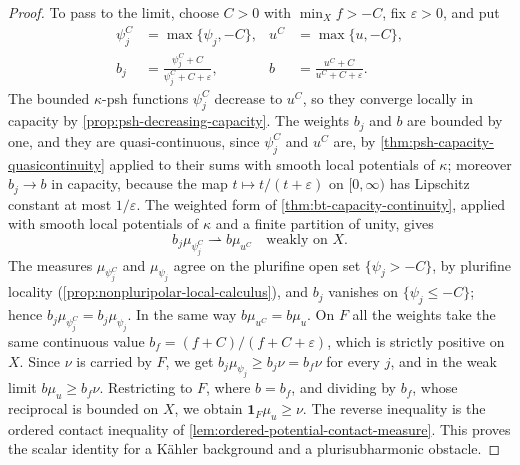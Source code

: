 \begin{proof}
To pass to the limit, choose $C>0$ with $\min_Xf>-C$, fix $\varepsilon>0$, and put
\[
 \begin{aligned}
 \psi_j^C&=\max\{\psi_j,-C\},&
 u^C&=\max\{u,-C\},\\
 b_j&=\frac{\psi_j^C+C}{\psi_j^C+C+\varepsilon},&
 b&=\frac{u^C+C}{u^C+C+\varepsilon}.
 \end{aligned}
\]
The bounded $\kappa$-psh functions $\psi_j^C$ decrease to $u^C$, so they converge locally in capacity by \cref{prop:psh-decreasing-capacity}. The weights $b_j$ and $b$ are bounded by one, and they are quasi-continuous, since $\psi_j^C$ and $u^C$ are, by \cref{thm:psh-capacity-quasicontinuity} applied to their sums with smooth local potentials of $\kappa$; moreover $b_j\to b$ in capacity, because the map $t\mapsto t/(t+\varepsilon)$ on $[0,\infty)$ has Lipschitz constant at most $1/\varepsilon$. The weighted form of \cref{thm:bt-capacity-continuity}, applied with smooth local potentials of $\kappa$ and a finite partition of unity, gives
\[
 b_j\mu_{\psi_j^C}\rightharpoonup b\mu_{u^C}
 \quad\text{weakly on }X.
\]
The measures $\mu_{\psi_j^C}$ and $\mu_{\psi_j}$ agree on the plurifine open set $\{\psi_j>-C\}$, by plurifine locality (\cref{prop:nonpluripolar-local-calculus}), and $b_j$ vanishes on $\{\psi_j\leq-C\}$; hence $b_j\mu_{\psi_j^C}=b_j\mu_{\psi_j}$. In the same way $b\mu_{u^C}=b\mu_u$. On $F$ all the weights take the same continuous value $b_f=(f+C)/(f+C+\varepsilon)$, which is strictly positive on $X$. Since $\nu$ is carried by $F$, we get $b_j\mu_{\psi_j}\geq b_j\nu=b_f\nu$ for every $j$, and in the weak limit $b\mu_u\geq b_f\nu$. Restricting to $F$, where $b=b_f$, and dividing by $b_f$, whose reciprocal is bounded on $X$, we obtain $\mathbf1_F\mu_u\geq\nu$. The reverse inequality is the ordered contact inequality of \cref{lem:ordered-potential-contact-measure}. This proves the scalar identity for a K\"ahler background and a plurisubharmonic obstacle.


\end{proof}
